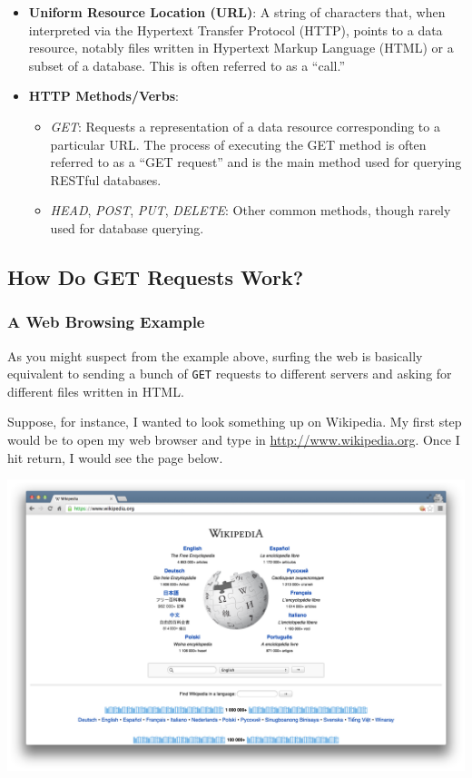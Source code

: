 \documentclass[
]{book}
\begin{document}
\begin{itemize}
\item
  \textbf{Uniform Resource Location (URL)}: A string of characters that, when interpreted via the Hypertext Transfer Protocol (HTTP), points to a data resource, notably files written in Hypertext Markup Language (HTML) or a subset of a database. This is often referred to as a ``call.''
\item
  \textbf{HTTP Methods/Verbs}:

  \begin{itemize}
  \item
    \emph{GET}: Requests a representation of a data resource corresponding to a particular URL. The process of executing the GET method is often referred to as a ``GET request'' and is the main method used for querying RESTful databases.
  \item
    \emph{HEAD}, \emph{POST}, \emph{PUT}, \emph{DELETE}: Other common methods, though rarely used for database querying.
  \end{itemize}
\end{itemize}

\hypertarget{how-do-get-requests-work}{%
\subsection{How Do GET Requests Work?}\label{how-do-get-requests-work}}

\hypertarget{a-web-browsing-example}{%
\subsubsection*{A Web Browsing Example}\label{a-web-browsing-example}}

As you might suspect from the example above, surfing the web is basically equivalent to sending a bunch of \texttt{GET} requests to different servers and asking for different files written in HTML.

Suppose, for instance, I wanted to look something up on Wikipedia. My first step would be to open my web browser and type in \url{http://www.wikipedia.org}. Once I hit return, I would see the page below.

\begin{center}\includegraphics[width=0.7\linewidth]{img/wikipedia} \end{center}
\end{document}
